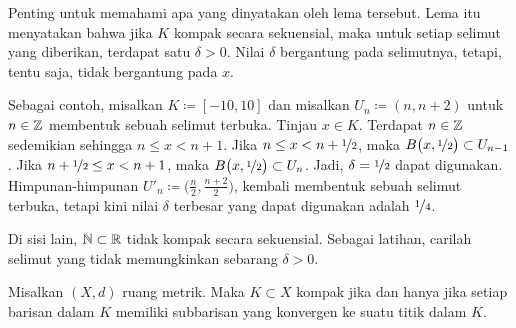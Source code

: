 \begin{myfigureht}
\caption{Pembuktian lema selimut Lebesgue.
Perhatikan bahwa $B(y,\nicefrac{\epsilon}{2}) \subset
B(x,\epsilon)$ berdasarkan ketaksamaan segitiga.\label{fig:lebesguedelta}}
\end{myfigureht}

Penting untuk memahami apa yang dinyatakan oleh lema tersebut.  Lema itu menyatakan bahwa
jika $K$ kompak secara sekuensial, maka untuk setiap
selimut yang diberikan, terdapat satu $\delta > 0$.  Nilai $\delta$ bergantung pada selimutnya,
tetapi, tentu saja, tidak bergantung pada $x$.

Sebagai contoh, misalkan $K \coloneqq [-10,10]$ dan misalkan
$U_n \coloneqq (n,n+2)$ untuk $n \in {\mathbb{Z}}$
membentuk sebuah selimut terbuka.
Tinjau $x \in K$. Terdapat $n \in {\mathbb{Z}}$ 
sedemikian sehingga $n \leq x < n+1$.
Jika $n \leq x < n+\nicefrac{1}{2}$, maka
$B\bigl(x,\nicefrac{1}{2}\bigr) \subset U_{n-1}$.
Jika $n+ \nicefrac{1}{2} \leq x < n+1$, maka
$B\bigl(x,\nicefrac{1}{2}\bigr) \subset U_{n}$.  Jadi, $\delta =
\nicefrac{1}{2}$ dapat digunakan.  Himpunan-himpunan 
$U'_n \coloneqq \bigl(\frac{n}{2},\frac{n+2}{2} \bigr)$,
kembali membentuk sebuah selimut terbuka,
tetapi kini nilai $\delta$ terbesar yang dapat digunakan adalah $\nicefrac{1}{4}$.

Di sisi lain, ${\mathbb{N}} \subset {\mathbb{R}}$ tidak kompak secara sekuensial.
Sebagai latihan, carilah selimut yang tidak memungkinkan sebarang $\delta > 0$.


\begin{thm} \label{thm:mscompactisseqcpt}
Misalkan $(X,d)$ ruang metrik.  Maka $K \subset X$ kompak jika dan
hanya jika setiap barisan dalam $K$ memiliki subbarisan yang konvergen ke
suatu titik dalam $K$.
\end{thm}

